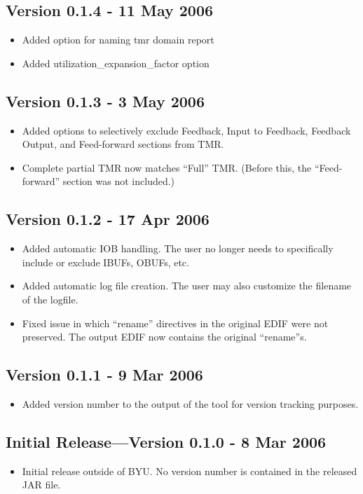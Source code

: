 \documentclass[english]{article}
\begin{document}
\subsection*{Version 0.1.4 - 11 May 2006}
\begin{itemize}
\item Added option for naming tmr domain report
\item Added utilization\_expansion\_factor option
\end{itemize}

\subsection*{Version 0.1.3 - 3 May 2006}
\begin{itemize}
\item Added options to selectively exclude Feedback, Input to Feedback, 
Feedback Output, and Feed-forward sections from TMR.
\item Complete partial TMR now matches ``Full'' TMR\@. (Before this, the 
``Feed-forward'' section was not included.)
\end{itemize}

\subsection*{Version 0.1.2 - 17 Apr 2006}
\begin{itemize}
\item Added automatic IOB handling. The user no longer needs to specifically 
include or exclude IBUFs, OBUFs, etc.
\item Added automatic log file creation. The user may also customize the 
filename of the logfile.
\item Fixed issue in which ``rename'' directives in the original EDIF were not 
preserved. The output EDIF now contains the original ``rename''s.
\end{itemize}

\subsection*{Version 0.1.1 - 9 Mar 2006}
\begin{itemize}
\item Added version number to the output of the tool for version tracking
purposes.
\end{itemize}

\subsection*{Initial Release---Version 0.1.0 - 8 Mar 2006}
\begin{itemize}
\item Initial release outside of BYU\@. No version number is contained in
the released JAR file.
\end{itemize}
\end{document}
